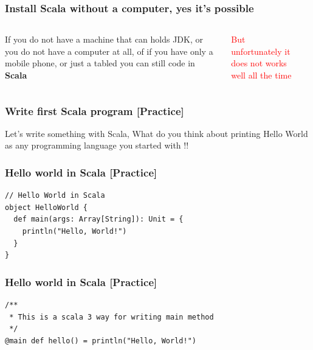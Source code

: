 \documentclass{beamer}
\begin{document}
\begin{frame}
\frametitle{Install Scala without a computer, yes it's possible}

\begin{columns}

If you do not have a machine that can holds JDK, or you do not have a computer at all, of if you have only a mobile phone, or just a tabled you can still code in \textbf{Scala}

\textcolor{red}{But unfortunately it does not works well all the time}
 
 \\
\end{columns}
\end{frame}

\begin{frame}
\frametitle{Write first Scala program [Practice]}

 Let's write something with Scala, What do you think about printing Hello World as any programming language you started with !!
 
\end{frame}


\begin{frame}[fragile]
\frametitle{Hello world in Scala [Practice]}

\begin{lstlisting}[style=scalaStyle]
// Hello World in Scala
object HelloWorld {
  def main(args: Array[String]): Unit = {
    println("Hello, World!") 
  }
}
\end{lstlisting}

\end{frame}



\begin{frame}[fragile]
\frametitle{Hello world in Scala [Practice]}

\begin{lstlisting}[style=scalaStyle]
/**
 * This is a scala 3 way for writing main method
 */
@main def hello() = println("Hello, World!")
\end{lstlisting}

\end{frame}
\end{document}
